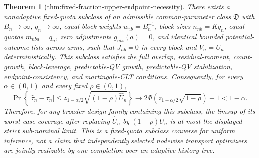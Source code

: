 \documentclass{article}
\newtheorem{theorem}{Theorem}
\begin{document}
\begin{theorem}[thm:fixed-fraction-upper-endpoint-necessity]\label{thm:fixed-fraction-upper-endpoint-necessity}
There exists a nonadaptive fixed-quota subclass of an admissible common-parameter class \(\mathfrak D\) with \(B_n\to\infty\), \(q_n\to\infty\), equal block weights \(w_{nb}=B_n^{-1}\), block sizes \(n_{nb}=Kq_n\), equal quotas \(m_{nba}=q_n\), zero adjustments \(g_{nbi}(a)=0\), and identical bounded potential-outcome lists across arms, such that \(J_{nb}^{-}=0\) in every block and \(V_n=U_n\) deterministically. This subclass satisfies the full overlap, residual-moment, count-growth, block-leverage, predictable-QV growth, predictable-QV stabilization, endpoint-consistency, and martingale-CLT conditions. Consequently, for every \(\alpha\in(0,1)\) and every fixed \(\rho\in(0,1)\),
\[
 \Pr\!\left\{|\widehat\tau_n-\tau_n|\le z_{1-\alpha/2}
 \sqrt{(1-\rho)\widehat U_n}\right\}
 \longrightarrow
 2\Phi\!\left(z_{1-\alpha/2}\sqrt{1-\rho}\right)-1
 <1-\alpha.
\]
Therefore, for any broader design family containing this subclass, the limsup of its worst-case coverage after replacing \(\widehat U_n\) by \((1-\rho)\widehat U_n\) is at most the displayed strict sub-nominal limit. This is a fixed-quota subclass converse for uniform inference, not a claim that independently selected nodewise transport optimizers are jointly realizable by one completion over an adaptive history tree.
\end{theorem}
\end{document}
